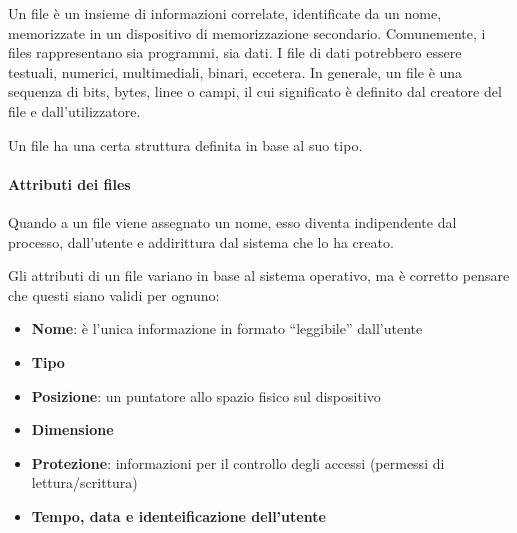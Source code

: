 \documentclass[a4paper]{article}
\begin{document}
Un file è un insieme di informazioni correlate, identificate da un nome, memorizzate in un dispositivo di memorizzazione secondario. Comunemente, i files rappresentano sia programmi, sia dati. I file di dati potrebbero essere testuali, numerici, multimediali, binari, eccetera. In generale, un file è una sequenza di bits, bytes, linee o campi, il cui significato è definito dal creatore del file e dall'utilizzatore.

Un file ha una certa struttura definita in base al suo tipo.

\paragraph{Attributi dei files}
Quando a un file viene assegnato un nome, esso diventa indipendente dal processo, dall'utente e addirittura dal sistema che lo ha creato.

Gli attributi di un file variano in base al sistema operativo, ma è corretto pensare che questi siano validi per ognuno:
\begin{itemize}
    \item \textbf{Nome}: è l'unica informazione in formato ``leggibile'' dall'utente
    \item \textbf{Tipo}
    \item \textbf{Posizione}: un puntatore allo spazio fisico sul dispositivo
    \item \textbf{Dimensione}
    \item \textbf{Protezione}: informazioni per il controllo degli accessi (permessi di lettura/scrittura)
    \item \textbf{Tempo, data e identeificazione dell'utente}
\end{itemize}
\end{document}
